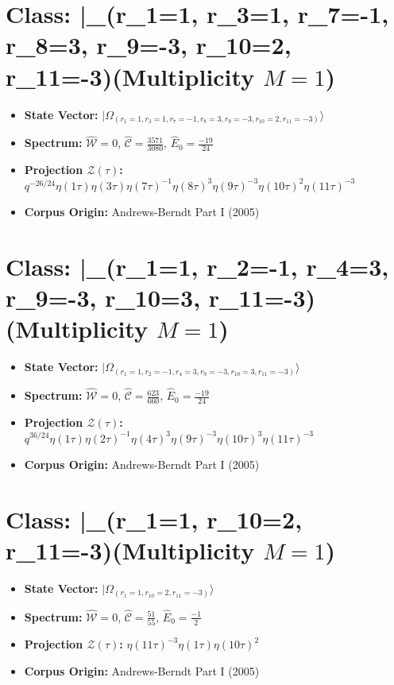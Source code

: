 \documentclass[11pt,twoside,openright]{book}
\begin{document}
\section*{Class: |\Omega_{(r_{1}=1, r_{3}=1, r_{7}=-1, r_{8}=3, r_{9}=-3, r_{10}=2, r_{11}=-3)}\rangle (Multiplicity $M=1$)}
\begin{itemize}
  \item \textbf{State Vector:} $|\Omega_{(r_{1}=1, r_{3}=1, r_{7}=-1, r_{8}=3, r_{9}=-3, r_{10}=2, r_{11}=-3)}\rangle$
  \item \textbf{Spectrum:} $\hat{\mathcal{W}} = 0$, $\hat{\mathcal{C}} = \frac{3571}{3080}$, $\hat{E}_0 = \frac{-19}{24}$
  \item \textbf{Projection $\mathcal{Z}(\tau)$:} $q^{-26/24} \eta(1\tau) \eta(3\tau) \eta(7\tau)^{-1} \eta(8\tau)^{3} \eta(9\tau)^{-3} \eta(10\tau)^{2} \eta(11\tau)^{-3}$
  \item \textbf{Corpus Origin:} Andrews-Berndt Part I (2005)
\end{itemize}

\section*{Class: |\Omega_{(r_{1}=1, r_{2}=-1, r_{4}=3, r_{9}=-3, r_{10}=3, r_{11}=-3)}\rangle (Multiplicity $M=1$)}
\begin{itemize}
  \item \textbf{State Vector:} $|\Omega_{(r_{1}=1, r_{2}=-1, r_{4}=3, r_{9}=-3, r_{10}=3, r_{11}=-3)}\rangle$
  \item \textbf{Spectrum:} $\hat{\mathcal{W}} = 0$, $\hat{\mathcal{C}} = \frac{623}{660}$, $\hat{E}_0 = \frac{-19}{24}$
  \item \textbf{Projection $\mathcal{Z}(\tau)$:} $q^{36/24} \eta(1\tau) \eta(2\tau)^{-1} \eta(4\tau)^{3} \eta(9\tau)^{-3} \eta(10\tau)^{3} \eta(11\tau)^{-3}$
  \item \textbf{Corpus Origin:} Andrews-Berndt Part I (2005)
\end{itemize}

\section*{Class: |\Omega_{(r_{1}=1, r_{10}=2, r_{11}=-3)}\rangle (Multiplicity $M=1$)}
\begin{itemize}
  \item \textbf{State Vector:} $|\Omega_{(r_{1}=1, r_{10}=2, r_{11}=-3)}\rangle$
  \item \textbf{Spectrum:} $\hat{\mathcal{W}} = 0$, $\hat{\mathcal{C}} = \frac{51}{55}$, $\hat{E}_0 = \frac{-1}{2}$
  \item \textbf{Projection $\mathcal{Z}(\tau)$:} $\eta(11\tau)^{-3} \eta(1\tau) \eta(10\tau)^{2}$
  \item \textbf{Corpus Origin:} Andrews-Berndt Part I (2005)
\end{itemize}
\end{document}
